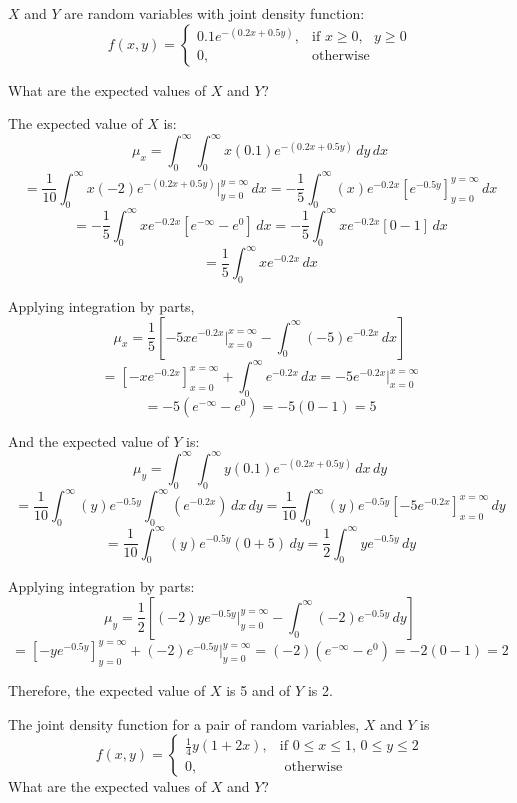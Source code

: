 \begin{Worked}
\begin{Problem}
$X$ and $Y$ are random variables with joint density function:
$$f(x, y) = 
\begin{cases}
0.1e^{-(0.2x + 0.5y)},&\text{if } x \geq 0,\text{ }y \geq 0\\
0,&\text{otherwise}
\end{cases}$$

What are the expected values of $X$ and $Y$?
\end{Problem}
\begin{Solution}
The expected value of $X$ is:
$$\mu_x = \int_0^{\infty} \int_0^{\infty} x(0.1)e^{-(0.2x + 0.5y)}\,dy\,dx$$
$$= \frac{1}{10} \int_0^{\infty} x \left(-2 \right) e^{-(0.2x + 0.5y)}|_{y = 0}
^{y = \infty}\,dx = -\frac{1}{5} \int_0^{\infty} (x)e^{-0.2x} \left[ e^{-0.5y} 
\right]_{y = 0}^{y = \infty}\,dx$$
$$= -\frac{1}{5} \int_0^{\infty} xe^{-0.2x} \left[ e^{-\infty} - e^0 \right]
\,dx = -\frac{1}{5} \int_0^{\infty} xe^{-0.2x} \left[0 - 1 \right]\,dx $$
$$= \frac{1}{5} \int_0^{\infty} xe^{-0.2x}\,dx$$

Applying integration by parts, 
$$\mu_x = \frac{1}{5} \left[ -5xe^{-0.2x}|_{x = 0}^{x = \infty} - \int_0^{
\infty} (-5)e^{-0.2x}\,dx \right]$$
$$= \left[-xe^{-0.2x} \right]_{x = 0}^{x = \infty} + \int_0^{\infty} e^{-0.2x}
\,dx  = -5e^{-0.2x}|_{x = 0}^{x = \infty}$$
$$= -5 \left(e^{-\infty} - e^0 \right) = -5 \left(0 - 1 \right) = 5$$

And the expected value of $Y$ is:
$$\mu_y = \int_0^{\infty} \int_0^{\infty} y(0.1)e^{-(0.2x + 0.5y)}\,dx\,dy$$
$$= \frac{1}{10} \int_0^{\infty} (y)e^{-0.5y} \int_0^{\infty} \left(e^{-0.2x} 
\right)\,dx\,dy = \frac{1}{10} \int_0^{\infty} (y)e^{-0.5y} \left[ -5e^{-0.2x} 
\right]_{x = 0}^{x = \infty}\,dy$$
$$= \frac{1}{10} \int_0^{\infty} (y)e^{-0.5y} \left(0 + 5 \right)\,dy = \frac{
1}{2} \int_0^{\infty} ye^{-0.5y}\,dy$$

Applying integration by parts:
$$\mu_y = \frac{1}{2} \left[(-2)ye^{-0.5y}|_{y = 0}^{y = \infty} - \int_0^{
\infty} (-2)e^{-0.5y}\,dy \right]$$
$$= \left[-ye^{-0.5y} \right]_{y = 0}^{y = \infty} + (-2)e^{-0.5y}|_{y = 0}^{y 
= \infty} = (-2) \left( e^{-\infty} - e^0 \right) = -2(0 - 1) = 2$$

Therefore, the expected value of $X$ is 5 and of $Y$ is 2. 
\end{Solution}
\end{Worked}

\begin{Exercise}[title = {Expected Values}, label = expect]
The joint density function for a pair of random variables, $X$ and $Y$ is
$$f(x, y) = 
\begin{cases}
	\frac{1}{4} y (1 + 2x),& \text{if } 0 \leq x \leq 1\text{, }0 \leq y \leq 2\\
	0,&\text{ otherwise}
\end{cases}$$
What are the expected values of $X$ and $Y$?
\end{Exercise}

